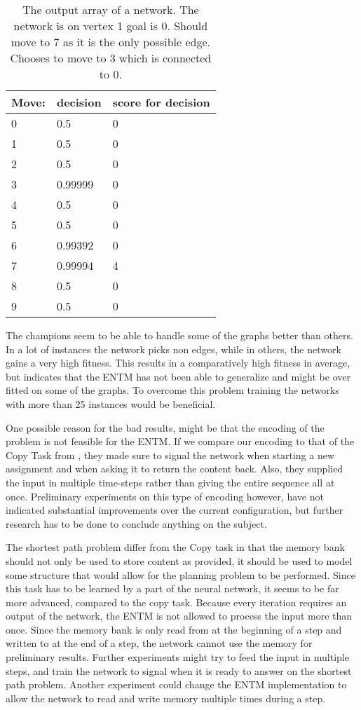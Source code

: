 \begin{table}[H]
	\centering
	\begin{tabular}{|l|l|l|}
		\hline
		Move:&	decision & score for decision\\\hline
		0&	0.5 & 0 \\\hline
		1&	0.5	& 0\\\hline
		2&	0.5	& 0\\\hline
		3&	0.99999 & 0\\\hline
		4&	0.5	& 0\\\hline
		5&	0.5	& 0\\\hline
		6&	0.99392 & 0\\\hline
		7&	0.99994 & 4\\\hline
		8&	0.5 & 0	\\\hline
		9&	0.5 & 0\\\hline
	\end{tabular}
	\caption{The output array of a network. The network is on vertex 1 goal is 0. Should move to 7 as it is the only possible edge. Chooses to move to 3 which is connected to 0.}
	\label{table:analysis:1}
\end{table}

\newpar The champions seem to be able to handle some of the graphs better than others. In a lot of instances the network picks non edges, while in others, the network gains a very high fitness. This results in a comparatively high fitness in average, but indicates that the ENTM has not been able to generalize and might be over fitted on some of the graphs. To overcome this problem training the networks with more than 25 instances would be beneficial.

\newpar One possible reason for the bad results, might be that the encoding of the problem is not feasible for the ENTM. If we compare our encoding to that of the Copy Task from \cite{greve2016evolving}, they made sure to signal the network when starting a new assignment and when asking it to return the content back. Also, they supplied the input in multiple time-steps rather than giving the entire sequence all at once. Preliminary experiments on this type of encoding however, have not indicated substantial improvements over the current configuration, but further research has to be done to conclude anything on the subject.

\newpar The shortest path problem differ from the Copy task in that the memory bank should not only be used to store content as provided, it should be used to model some structure that would allow for the planning problem to be performed. Since this task has to be learned by a part of the neural network, it seems to be far more advanced, compared to the copy task.
Because every iteration requires an output of the network, the ENTM is not allowed to process the input more than once. Since the memory bank is only read from at the beginning of a step and written to at the end of a step, the network cannot use the memory for preliminary results. 
Further experiments might try to feed the input in multiple steps, and train the network to signal when it is ready to answer on the shortest path problem. Another experiment could change the ENTM implementation to allow the network to read and write memory multiple times during a step.

\clearpage